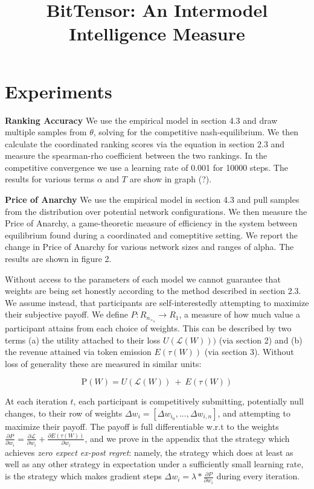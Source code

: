 \documentclass{article}
\title{BitTensor: An Intermodel Intelligence Measure}
\begin{document}
\section{Experiments}

\textbf{Ranking Accuracy} We use the empirical model in section 4.3 and draw multiple samples from $\theta$, solving for the competitive nash-equilibrium. We then calculate the coordinated ranking scores via the equation in section 2.3 and measure the spearman-rho coefficient between the two rankings. In the competitive convergence we use a learning rate of 0.001 for 10000 steps. The results for various terms $\alpha$ and $T$ are show in graph (?). 
\smallskip

\textbf{Price of Anarchy} We use the empirical model in section 4.3 and pull samples from the distribution over potential network configurations. We then measure the Price of Anarchy, a game-theoretic measure of efficiency in the system between equilibrium found during a coordinated and comeptitive setting. We report the change in Price of Anarchy for various network sizes and ranges of alpha. The results are shown in figure 2.
\smallskip

Without access to the parameters of each model we cannot guarantee that weights are being set honestly according to the method described in section 2.3. We assume instead, that  participants are self-interestedly attempting to maximize their subjective payoff. We define $P: R_n_\times_n \rightarrow R_1$, a measure of how much value a participant attains from each choice of weights. This can be described by two terms (a) the utility attached to their loss $U(\mathcal{L}(W)))$ (via section 2) and (b) the revenue attained via token emission $E(\tau(W))$ (via section 3). Without loss of generality these are measured in similar units:
\smallskip


\[ \textrm{P}(W) = U(\mathcal{L}(W)) \ + \ E(\tau(W)) \] 

At each iteration $t$, each participant is competitively submitting, potentially null changes, to their row of weights $\Delta w_i = [\Delta w_{i_0}, ..., \Delta w_{i, n}]$, and attempting to maximize their payoff. The payoff is full differentiable w.r.t to the weights $\frac{\partial P}{\partial w_i} = \frac{\partial \mathcal{L}}{\partial w_i} + \frac{\partial E(\tau(W))}{\partial w_i}$, and we prove in the appendix that the strategy which achieves \textit{zero expect ex-post regret}: namely, the strategy which does at least as well as any other strategy in expectation under a sufficiently small learning rate, is the strategy which makes gradient steps $\Delta w_i = \lambda * \frac{\partial P}{\partial w_i}$ during every iteration.
\smallskip
\end{document}
